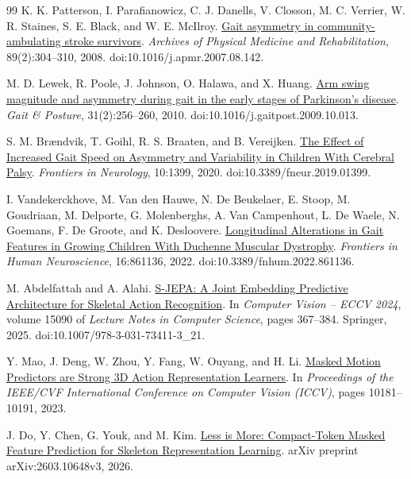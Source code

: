 \documentclass{article}
\begin{document}
{\renewcommand{\bibfont}{\small}
\begin{thebibliography}{99}
 K. K. Patterson, I. Parafianowicz, C. J. Danells, V. Closson, M. C. Verrier, W. R. Staines, S. E. Black, and W. E. McIlroy. \href{https://pubmed.ncbi.nlm.nih.gov/18226655/}{Gait asymmetry in community-ambulating stroke survivors}. \emph{Archives of Physical Medicine and Rehabilitation}, 89(2):304--310, 2008. doi:10.1016/j.apmr.2007.08.142.

 M. D. Lewek, R. Poole, J. Johnson, O. Halawa, and X. Huang. \href{https://pubmed.ncbi.nlm.nih.gov/19945285/}{Arm swing magnitude and asymmetry during gait in the early stages of Parkinson's disease}. \emph{Gait \& Posture}, 31(2):256--260, 2010. doi:10.1016/j.gaitpost.2009.10.013.

 S. M. Brændvik, T. Goihl, R. S. Braaten, and B. Vereijken. \href{https://pubmed.ncbi.nlm.nih.gov/32082235/}{The Effect of Increased Gait Speed on Asymmetry and Variability in Children With Cerebral Palsy}. \emph{Frontiers in Neurology}, 10:1399, 2020. doi:10.3389/fneur.2019.01399.

 I. Vandekerckhove, M. Van den Hauwe, N. De Beukelaer, E. Stoop, M. Goudriaan, M. Delporte, G. Molenberghs, A. Van Campenhout, L. De Waele, N. Goemans, F. De Groote, and K. Desloovere. \href{https://pmc.ncbi.nlm.nih.gov/articles/PMC9201072/}{Longitudinal Alterations in Gait Features in Growing Children With Duchenne Muscular Dystrophy}. \emph{Frontiers in Human Neuroscience}, 16:861136, 2022. doi:10.3389/fnhum.2022.861136.

 M. Abdelfattah and A. Alahi. \href{https://www.ecva.net/papers/eccv_2024/papers_ECCV/papers/04755.pdf}{S-JEPA: A Joint Embedding Predictive Architecture for Skeletal Action Recognition}. In \emph{Computer Vision -- ECCV 2024}, volume 15090 of \emph{Lecture Notes in Computer Science}, pages 367--384. Springer, 2025. doi:10.1007/978-3-031-73411-3\_21.

 Y. Mao, J. Deng, W. Zhou, Y. Fang, W. Ouyang, and H. Li. \href{https://arxiv.org/abs/2308.07092}{Masked Motion Predictors are Strong 3D Action Representation Learners}. In \emph{Proceedings of the IEEE/CVF International Conference on Computer Vision (ICCV)}, pages 10181--10191, 2023.

 J. Do, Y. Chen, G. Youk, and M. Kim. \href{https://arxiv.org/abs/2603.10648}{Less is More: Compact-Token Masked Feature Prediction for Skeleton Representation Learning}. arXiv preprint arXiv:2603.10648v3, 2026.


\end{thebibliography}}
\end{document}
